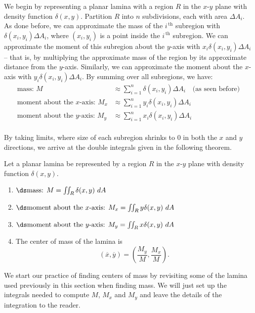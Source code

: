 We begin by representing a planar lamina with a region $R$ in the $x$-$y$ plane with density function $\delta(x,y)$. Partition $R$ into $n$ subdivisions, each with area $\Delta A_i$. As done before, we can approximate the mass of the $i^{\,\text{th}}$ subregion with $\delta(x_i,y_i)\Delta A_i$, where $(x_i,y_i)$ is a point inside the $i^{\,\text{th}}$ subregion. We can approximate the moment of this subregion about the $y$-axis with $x_i\delta(x_i,y_i)\Delta A_i$ -- that is, by multiplying the approximate mass of the region by its approximate distance from the $y$-axis. Similarly, we can approximate the moment about the $x$-axis with $y_i\delta(x_i,y_i)\Delta A_i$. By summing over all subregions, we have:
\begin{align*}
\text{mass: } M &\approx \sum_{i=1}^n \delta(x_i,y_i)\Delta A_i\quad \text{(as seen before)}\\
\text{moment about the $x$-axis: } M_x &\approx \sum_{i=1}^n y_i\delta(x_i,y_i)\Delta A_i\\
\text{moment about the $y$-axis: } M_y &\approx \sum_{i=1}^n x_i\delta(x_i,y_i)\Delta A_i\\
\end{align*}

By taking limits, where size of each subregion shrinks to 0 in both the $x$ and $y$ directions, we arrive at the double integrals given in the following theorem.

{Let a planar lamina be represented by a region $R$ in the $x$-$y$ plane with density function $\delta(x,y)$. 
\begin{enumerate}
	\item $\ds \text{mass: } M = \iint_R\delta(x,y)\ dA$
	\item	$\ds \text{moment about the $x$-axis: } M_x = \iint_Ry\delta(x,y)\ dA$
	\item	$\ds \text{moment about the $y$-axis: } M_y = \iint_Rx\delta(x,y)\ dA$
	\item The center of mass  of the lamina is
	\[(\overline{x},\overline{y}) = \left(\frac{M_y}{M},\frac{M_x}M\right).\]
\end{enumerate}
}

We start our practice of finding centers of mass by revisiting some of the lamina used previously in this section when finding mass. We will  just set up the integrals needed to compute $M$, $M_x$ and $M_y$ and leave the details of the integration to the reader.

